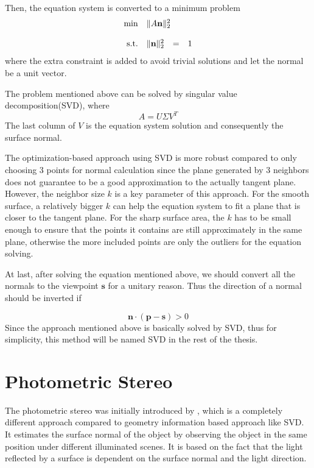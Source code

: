 Then, the equation system is converted to a minimum problem 
\begin{equation}
	\begin{array}{rrclcl}
		\displaystyle \min & \multicolumn{3}{l}{\| A  \bn \|^2_2} \\
		\\
		\textrm{s.t.} & \| \bn \|^2_2 & = & 1 
	\end{array}
\end{equation}
where the extra constraint is added to avoid trivial solutions and let the normal be a unit vector.

The problem mentioned above can be solved by singular value decomposition(SVD), where
\[ A=U\Sigma V^T \]
The last column of $ V $ is the equation system solution and consequently the surface normal. 

The optimization-based approach using SVD is more robust compared to only choosing 3 points for normal calculation since the plane generated by 3 neighbors does not guarantee to be a good approximation to the actually tangent plane. However, the neighbor size $ k $ is a key parameter of this approach. For the smooth surface, a relatively bigger $ k $ can help the equation system to fit a plane that is closer to the tangent plane. For the sharp surface area, the $ k $ has to be small enough to ensure that the points it contains are still approximately in the same plane, otherwise the more included points are only the outliers for the equation solving. 

At last, after solving the equation mentioned above, we should convert all the normals to the viewpoint $ \textbf{s} $ for a unitary reason. Thus the direction of a normal should be inverted if 

\begin{equation}\label{eq:normal-invertion}
	\textbf{n} \cdot (\textbf{p}  - \textbf{s}) > 0
\end{equation}
Since the approach mentioned above is basically solved by SVD, thus for simplicity, this method will be named SVD in the rest of the thesis.


\section{Photometric Stereo}
The photometric stereo was initially introduced by \cite{photometric-stereo}, which is a completely different approach compared to geometry information based approach like SVD. It estimates the surface normal of the object by observing the object in the same position under different illuminated scenes. It is based on the fact that the light reflected by a surface is dependent on the surface normal and the light direction.

